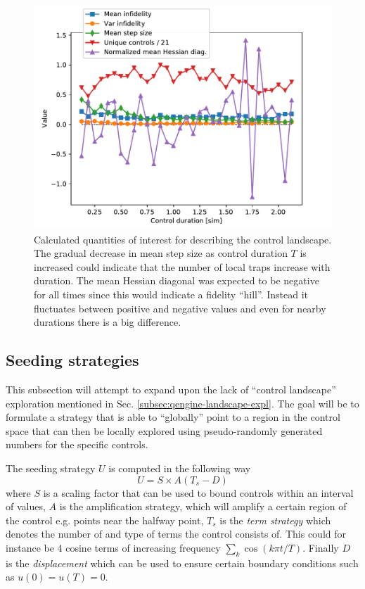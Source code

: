 \documentclass[a4paper, twocolumn]{revtex4-1}
\begin{document}
\begin{figure}
	\includegraphics[width=\columnwidth]{graphics/qengine/landscapes/Landscape.pdf}
	\caption{Calculated quantities of interest for describing the control landscape. The gradual decrease in mean step size as control duration $T$ is increased could indicate that the number of local traps increase with duration. The mean Hessian diagonal was expected to be negative for all times since this would indicate a fidelity ``hill''. Instead it fluctuates between positive and negative values and even for nearby durations there is a big difference. }
	\label{fig:qengine-landscape}
\end{figure}

\subsection{Seeding strategies}\label{subsec:qengine-seeding-strats}
This subsection will attempt to expand upon the lack of ``control landscape'' exploration mentioned in Sec. \ref{subsec:qengine-landscape-expl}. The goal will be to formulate a strategy that is able to ``globally'' point to a region in the control space that can then be locally explored using pseudo-randomly generated numbers for the specific controls.

The seeding strategy $U$ is computed in the following way
\begin{equation}
	U = S \times A (T_s - D)
	\label{eq:seeding-strategy-formalism}
\end{equation}
where $S$ is a scaling factor that can be used to bound controls within an interval of values, $A$ is the amplification strategy, which will amplify a certain region of the control e.g. points near the halfway point, $T_s$ is the \textit{term strategy} which denotes the number of and type of terms the control consists of. This could for instance be 4 cosine terms of increasing frequency $\sum_k \cos(k \pi t/T)$. Finally $D$ is the \textit{displacement} which can be used to ensure certain boundary conditions such as $u(0)=u(T)=0$.
\end{document}
